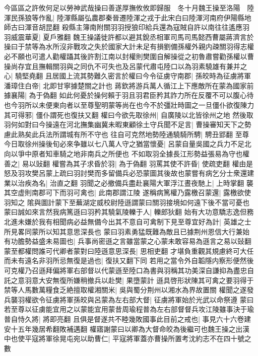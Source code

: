 今區區之許攸何足以勞神武哉操曰善遂厚撫攸攸即歸服　冬十月魏王操至洛陽　陸渾民孫狼等作亂|{
	陸渾縣屬弘農郡秦晉遷陸渾之戎于此宋白曰陸渾河南府伊陽縣地師古曰渾音胡昆翻}
殺縣主簿南附關羽羽授狼印給兵還為寇賊自許以南往往遙應羽羽威震華夏|{
	夏戶雅翻}
魏王操議徙許都以避其銳丞相軍司馬司馬懿西曹屬蔣濟言於操曰于禁等為水所沒非戰攻之失於國家大計未足有損劉備孫權外親内疎關羽得志權必不願也可遣人勸權躡其後許割江南以封權則樊圍自解操從之初魯肅嘗勸孫權以曹操尚存宜且撫輯關羽與之同仇不可失也及呂蒙代肅屯陸口以為羽素驍雄有兼并之心|{
	驍堅堯翻}
且居國上流其勢難久密言於權曰今令征虜守南郡|{
	孫皎時為征虜將軍}
潘璋住白帝|{
	北即甘寧據楚關之計也}
蔣欽將游兵萬人循江上下應敵所在蒙為國家前據襄陽|{
	為于偽翻}
如此何憂於操何賴于羽且羽君臣矜其詐力所在反覆不可以腹心待也今羽所以未便東向者以至尊聖明蒙等尚在也今不於彊壯時圖之一旦僵仆欲復陳力其可得邪|{
	僵仆謂死也復扶又翻}
權曰今欲先取徐州|{
	自廣陵以北皆徐州之地}
然後取羽何如對曰今操遠在河北撫集幽冀未暇東顧徐土守兵聞不足言|{
	曹操審知天下之勢慮此熟矣此兵法所謂城有所不守也}
往自可克然地勢陸通驍騎所騁|{
	騁丑郢翻}
至尊今日取徐州操後旬必來争雖以七八萬人守之猶當懷憂|{
	呂蒙自量吳國之兵力不足北向以爭中原者知車騎之地非南兵之所便也}
不如取羽全據長江形勢益張易為守也權善之|{
	易以䜴翻}
權嘗為其子求昏於羽|{
	為于偽翻}
羽罵其使不許昏|{
	使疏吏翻}
權由是怒及羽攻樊呂蒙上疏曰羽討樊而多留備兵必恐蒙圖其後故也蒙嘗有病乞分士衆還建業以治疾為名|{
	治直之翻}
羽聞之必撤備兵盡赴襄陽大軍浮江晝夜馳上|{
	上時掌翻}
襲其空虚則南郡可下而羽可禽也|{
	此南郡謂江陵}
遂稱病篤權乃露檄召蒙還|{
	露檄欲使羽知之}
隂與圖計蒙下至蕪湖定威校尉陸遜謂蒙曰關羽接境如何遠下後不當可憂也蒙曰誠如來言然我病篤遜曰羽矜其驍氣陵轢于人|{
	轢郎狄翻}
始有大功意驕志逸但務北進未嫌於我有相聞病必益無備今出其不意自可禽制下見至尊宜好為計|{
	英雄之士所見畧同蒙所以知其意思深長也}
蒙曰羽素勇猛既難為敵且已據荆州恩信大行兼始有功膽勢益盛未易圖也|{
	兵事尚密遜之言雖當蒙之心蒙未敢容易為遜言之易以䜴翻}
蒙至都權問誰可代卿者蒙對曰陸遜意思深長|{
	思相吏翻}
才堪負重觀其規慮終可大任而未有遠名非羽所忌無復是過也|{
	復扶又翻下同}
若用之當令外自韜隱内察形便然後可克權乃召遜拜偏將軍右部督以代蒙遜至陸口為書與羽稱其功美深自謙抑為盡忠自託之意羽意大安無復所嫌稍撤兵以赴樊|{
	果墮蒙計}
遜具啓形狀陳其可禽之要羽得于禁等人馬數萬糧食乏絶擅取權湘關米|{
	吳與蜀分荆州以湘水為界故置關}
權聞之遂發兵襲羽權欲令征虜將軍孫皎與呂蒙為左右部大督|{
	征虜將軍始於光武以命祭遵}
蒙曰若至尊以征虜能宜用之以蒙能宜用蒙昔周瑜程普為左右部督督兵攻江陵雖事決于瑜普自恃久將|{
	將即亮翻}
且俱是督遂共不睦幾敗國事此目前之戒也|{
	事見六十六卷建安十五年幾居希翻敗補邁翻}
權寤謝蒙曰以卿為大督命皎為後繼可也魏王操之出漢中也使平寇將軍徐晃屯宛以助曹仁|{
	平寇將軍蓋亦曹操所置考沈約志不在四十號之數}
